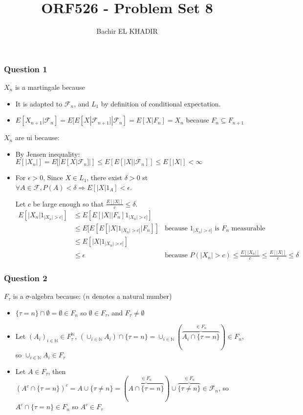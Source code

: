 \documentclass[12pt]{article}
\title{ORF526 - Problem Set 8}
\author{Bachir EL KHADIR }
\newcommand{\Q}[1]{\subsubsection*{Question #1}}
\newcommand{\OB}[1]{\overbrace{#1}^{\in F_n}}
\begin{document}
\maketitle

\Q{1}
$X_n$ is a martingale because
\begin{itemize}
\item It is adapted to $\mathcal F_n$, and $L_1$ by definition of conditional expectation.
\item $E[X_{n+1}|\mathcal F_n] = E[ E[X | \mathcal F_{n+1}] | \mathcal F_n] = E[X|F_n] = X_n$ because $F_n \subseteq F_{n+1}$
\end{itemize}

$X_n$ are ui because:
\begin{itemize}
\item
  By Jensen inequality: $E[|X_n|] = E[|E[X|\mathcal F_n]|] \le E[E[|X| |\mathcal F_n]] \le
  E[|X|] < \infty$

\item
  For $\epsilon > 0$,
  Since $X \in L_1$, there exist $\delta > 0$ st $\forall A \in \mathcal F, P(A) < \delta \Rightarrow E[|X|1_A] < \epsilon$.
  
  Let $c$ be large enough so that $\frac{E[|X|]}{c} \le \delta$.
  \begin{align*}
    E[|X_n| 1_{|X_n| > c]}] &\le E[ E[|X| | F_n] 1_{|X_n| > c]}]
    \\& \le E[E[ E[|X|  1_{|X_n| > c]} | F_n]] &\text{because $1_{|X_n| > c]}$ is $F_n$ measurable}
    \\& \le E[|X|1_{|X_n| > c]}]
    \\& \le \epsilon &\text{because $P(|X_n| > c) \le \frac{E[|X_n|]}{c} \le \frac{E[|X|]}{c} \le \delta$}
  \end{align*}
\end{itemize}

\Q{2}
$F_{\tau}$ is a $\sigma$-algebra because:
($n$ denotes a natural number)
\begin{itemize}
\item $\{\tau = n\} \cap \emptyset = \emptyset \in F_n$ so $\emptyset \in F_{\tau}$, and $F_{\tau} \ne \emptyset$
\item Let $(A_i)_{i \in \mathbb{N}} \in F_{\tau}^{\mathbb{N}}$,
  $(\cup_{i \in \mathbb{N}} A_i) \cap \{ \tau = n \} = \cup_{i \in \mathbb{N}} (\OB{A_i \cap \{ \tau = n \}}) \in F_n$, so $\cup_{i \in \mathbb{N}} A_i \in F_{\tau}$
\item Let $A \in F_{\tau}$, then $(A^c \cap \{\tau = n\})^c = A \cup \{\tau \ne n\} = (\OB{A \cap \{\tau = n\}}) \cup \OB{\{\tau \ne n\}} \in \mathcal F_n$, so $A^c \cap \{\tau = n\} \in F_n$ so $A^c \in F_{\tau}$

\end{itemize}
\end{document}
